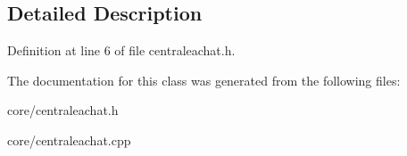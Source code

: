 \subsection{Detailed Description}


Definition at line 6 of file centraleachat.h.



The documentation for this class was generated from the following files:\begin{DoxyCompactItemize}
\item 
core/centraleachat.h\item 
core/centraleachat.cpp\end{DoxyCompactItemize}
